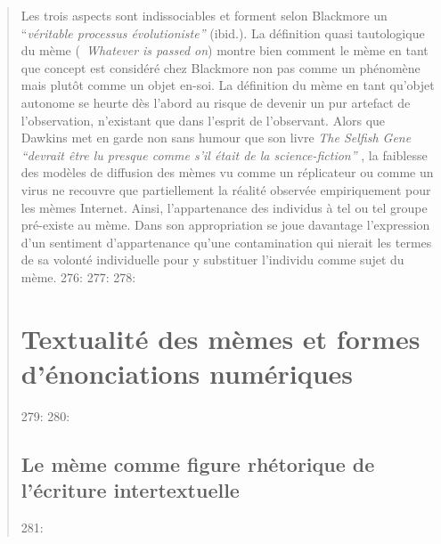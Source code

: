\begin{quote}
Les trois aspects sont indissociables et forment selon Blackmore un {\textquotedblleft}\textit{v\'eritable processus \'evolutioniste{\textquotedblright} }(ibid.). La d\'efinition quasi tautologique du m\`eme ({\guillemotleft}~\textit{Whatever is passed on{\guillemotright}}) montre bien comment le m\`eme en tant que concept est consid\'er\'e chez Blackmore non pas comme un ph\'enom\`ene mais plut\^ot comme un objet en-soi. La d\'efinition du m\`eme en tant qu{\textquoteright}objet autonome se heurte d\`es l{\textquoteright}abord au risque de devenir un pur artefact de l{\textquoteright}observation, n{\textquoteright}existant que dans l{\textquoteright}esprit de l{\textquoteright}observant. Alors que Dawkins met en garde non sans humour que son livre \textit{The Selfish Gene} \textit{{\textquotedblleft}devrait \^etre lu presque comme s{\textquoteright}il \'etait de la science-fiction{\textquotedblright} }\cite{Dawkins1984}, la faiblesse des mod\`eles de diffusion des m\`emes vu comme un r\'eplicateur ou comme un virus ne recouvre que partiellement la r\'ealit\'e observ\'ee empiriquement pour les m\`emes Internet. Ainsi, l{\textquoteright}appartenance des individus \`a tel ou tel groupe pr\'e-existe au m\`eme. Dans son appropriation se joue davantage l{\textquoteright}expression d{\textquoteright}un sentiment d{\textquoteright}appartenance qu{\textquoteright}une contamination qui nierait les termes de sa volont\'e individuelle pour y substituer l{\textquoteright}individu comme sujet du m\`eme.  
276: 
277: 
278: \section[Textualit\'e des m\`emes et formes d{\textquoteright}\'enonciations num\'eriques]{Textualit\'e des m\`emes et formes d{\textquoteright}\'enonciations num\'eriques}
279: 
280: \subsection[Le m\`eme comme figure rh\'etorique de l{\textquoteright}\'ecriture intertextuelle]{Le m\`eme comme figure rh\'etorique de l{\textquoteright}\'ecriture intertextuelle}
281: 

\end{quote}
